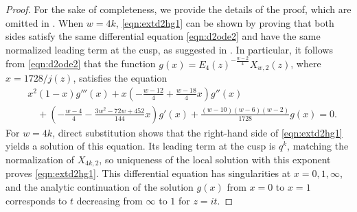 \documentclass[10pt,reqno]{amsproc}
\newcommand{\1}{\mathds{1}}	%
\theoremstyle{definition}
\theoremstyle{remark}
\begin{document}
\begin{proof}
For the sake of completeness, we provide the details of the proof, which are omitted in \cite{nakaya2024determination}.
When $w = 4k$, \eqref{eqn:extd2hg1} can be shown by proving that both sides satisfy the same differential equation \eqref{eqn:d2ode2} and have the same normalized leading term at the cusp, as suggested in \cite[Section 6.1]{nakaya2024determination}.
In particular, it follows from \eqref{eqn:d2ode2} that the function $g(x) = E_4(z)^{-\frac{w-2}{4}}X_{w, 2}(z)$, where $x = 1728 / j(z)$, satisfies the equation
\begin{align*}
    &x^2(1 - x) g'''(x) + x \left(-\frac{w-12}{4} + \frac{w-18}{4} x\right) g''(x) \\
    &\quad + \left(-\frac{w-4}{4} - \frac{3w^2 - 72w + 452}{144}x\right) g'(x) + \frac{(w-10)(w-6)(w-2)}{1728} g(x) = 0.
\end{align*}
For $w=4k$, direct substitution shows that the right-hand side of \eqref{eqn:extd2hg1} yields a solution of this equation. Its leading term at the cusp is $q^k$, matching the normalization of $X_{4k,2}$, so uniqueness of the local solution with this exponent proves \eqref{eqn:extd2hg1}.
This differential equation has singularities at $x = 0,1,\infty$, and the analytic continuation of the solution $g(x)$ from $x = 0$ to $x = 1$ corresponds to $t$ decreasing from $\infty$ to $1$ for $z = it$.


\end{proof}
\end{document}
